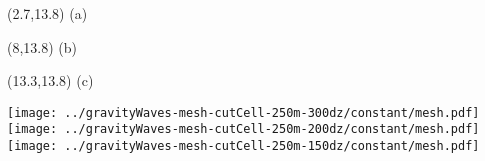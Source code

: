\documentclass{article}
\begin{document}
\TPMargin{2pt}
\begin{textblock}{0.5}(2.7,13.8)
\normalsize
(a)
\end{textblock}
\begin{textblock}{1}(8,13.8)
\normalsize
(b)
\end{textblock}
\begin{textblock}{1}(13.3,13.8)
\normalsize
(c)
\end{textblock}
\texttt{[image: ../gravityWaves-mesh-cutCell-250m-300dz/constant/mesh.pdf]}
\texttt{[image: ../gravityWaves-mesh-cutCell-250m-200dz/constant/mesh.pdf]}
\texttt{[image: ../gravityWaves-mesh-cutCell-250m-150dz/constant/mesh.pdf]}
\end{document}
